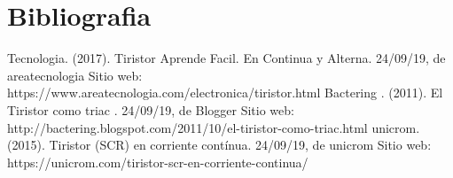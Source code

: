 \documentclass[12pt,a4paper]{article}
\begin{document}
\section{Bibliografia}
\begin{flushleft}
Tecnologia. (2017). Tiristor Aprende Facil. En Continua y Alterna. 24/09/19, de areatecnologia Sitio web: https://www.areatecnologia.com/electronica/tiristor.html
\linebreak
\linebreak
Bactering . (2011). El Tiristor como triac . 24/09/19, de Blogger Sitio web: http://bactering.blogspot.com/2011/10/el-tiristor-como-triac.html
\linebreak
\linebreak
unicrom. (2015). Tiristor (SCR) en corriente contínua. 24/09/19, de unicrom Sitio web: https://unicrom.com/tiristor-scr-en-corriente-continua/
\linebreak

\end{flushleft}
\end{document}
